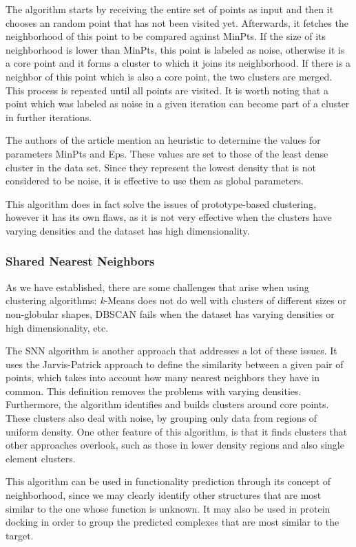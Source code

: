 The algorithm starts by receiving the entire set of points as input and then it chooses an random point that has not been visited yet. Afterwards, it fetches the neighborhood of this point to be compared against MinPts. If the size of its neighborhood is lower than MinPts, this point is labeled as noise, otherwise it is a core point and it forms a cluster to which it joins its neighborhood. If there is a neighbor of this point which is also a core point, the two clusters are merged. This process is repeated until all points are visited. It is worth noting that a point which was labeled as noise in a given iteration can become part of a cluster in further iterations.

The authors of the article mention an heuristic to determine the values for parameters MinPts and Eps. These values are set to those of the least dense cluster in the data set. Since they represent the lowest density that is not considered to be noise, it is effective to use them as global parameters.

This algorithm does in fact solve the issues of prototype-based clustering, however it has its own flaws, as it is not very effective when the clusters have varying densities and the dataset has high dimensionality.

\subsubsection{Shared Nearest Neighbors}

As we have established, there are some challenges that arise when using clustering algorithms: \textit{k}-Means does not do well with clusters of different sizes or non-globular shapes, DBSCAN fails when the dataset has varying densities or high dimensionality, etc.

The \gls{SNN} algorithm is another approach that addresses a lot of these issues. It uses the Jarvis-Patrick \cite{jarvis1973clustering} approach to define the similarity between a given pair of points, which takes into account how many nearest neighbors they have in common. This definition removes the problems with varying densities. Furthermore, the algorithm identifies and builds clusters around core points. These clusters also deal with noise, by grouping only data from regions of uniform density. One other feature of this algorithm, is that it finds clusters that other approaches overlook, such as those in lower density regions and also single element clusters.

This algorithm can be used in functionality prediction through its concept of neighborhood, since we may clearly identify other structures that are most similar to the one whose function is unknown. It may also be used in protein docking in order to group the predicted complexes that are most similar to the target.

